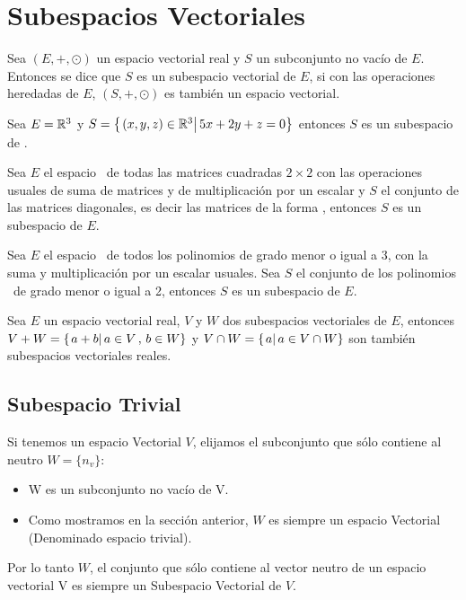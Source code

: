 \newpage
\section{Subespacios Vectoriales}
\begin{dfn}
Sea $(E, +, \odot)$ un espacio vectorial real y $S$ un subconjunto no vacío de $E$. Entonces se dice que $S$ es un subespacio vectorial de $E$, si con las operaciones heredadas de $E$, $(S, +, \odot)$ es también un espacio vectorial.
\end{dfn}


\begin{ejemplo}
Sea $E = \mathbb{R}^3$ y $S = \left\{ \left. (x, y, z) \in \mathbb{R}^3\right| 5x + 2y + z = 0 \right\}$ entonces $S$ es un subespacio de \rtres.
\end{ejemplo}

\begin{ejemplo}
Sea $E$ el espacio \mdosxdos \ de todas las matrices cuadradas $2 \times 2$ con las operaciones usuales de suma de matrices y de multiplicación por un escalar y $S$ el conjunto de las matrices diagonales, es decir las matrices de la forma , entonces $S$ es un subespacio de $E$.

\end{ejemplo}

\begin{ejemplo}
Sea $E$ el espacio \ptres \ de todos los polinomios de grado menor o igual a 3, con la suma y multiplicación por un escalar usuales. Sea $S$ el conjunto de los polinomios \pdos \ de grado menor o igual a 2, entonces $S$ es un subespacio de $E$.
\end{ejemplo}

\begin{ejemplo}

Sea $E$ un espacio vectorial real, $V$ y $W$ dos subespacios vectoriales de $E$, entonces $V + W =\left\{ \left. a+b\right| a \in V \, , \, b \in W \right\}$ y $V \cap W = \left\{ \left. a\right| a \in V \cap W \right\}$ son también subespacios vectoriales reales.
\end{ejemplo}



\subsection{Subespacio Trivial}
Si tenemos un espacio Vectorial $V$, elijamos el subconjunto que s\'olo contiene al neutro
$W=\lbrace n_v\rbrace$:
~\\	
\begin{itemize}
 \item W es un subconjunto no vac\'io de V.
\item Como mostramos en la sección anterior, $W$ es siempre un espacio Vectorial (Denominado espacio trivial).
 \end{itemize} 
Por lo tanto $W$, el conjunto que s\'olo contiene al vector neutro de un espacio vectorial V es siempre un Subespacio Vectorial de $V$.
